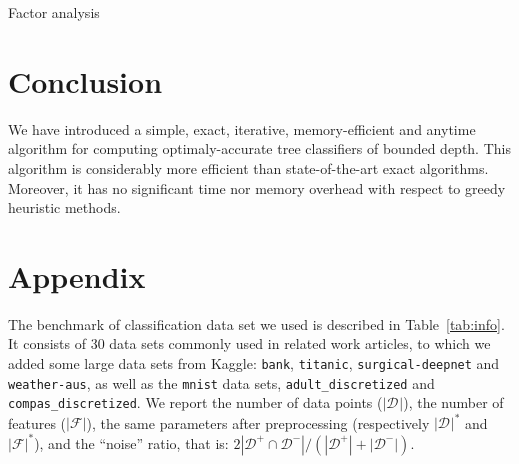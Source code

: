 \documentclass{llncs}
\def\posclass{+}
\def\negclass{-}
\def\datasymb{D}
\newcommand{\setex}[1]{\ensuremath{{\mathcal \datasymb}^{#1}}\xspace}
\newcommand{\posex}{{\setex{\posclass}}\xspace}
\newcommand{\negex}{{\setex{\negclass}}\xspace}
\newcommand{\allex}{{\setex{}}\xspace}
\newcommand{\features}{\ensuremath{{\mathcal F}}\xspace}
\begin{document}
\begin{table}[htbp]
\begin{center}
\begin{footnotesize}
\tabcolsep=2pt

\end{footnotesize}
\end{center}
\caption{\label{tab:factor} Factor analysis}
\end{table}

% 


\section{Conclusion}

We have introduced a simple, exact, iterative, memory-efficient and anytime algorithm for computing optimaly-accurate tree classifiers of bounded depth.
This algorithm is considerably more efficient than state-of-the-art exact algorithms. Moreover, it has no significant time nor memory overhead with respect to greedy heuristic methods.







\clearpage


\section*{Appendix}

The benchmark of classification data set we used is described in Table~\ref{tab:info}. It consists of 30 data sets 
commonly used in related work articles, to which we added some large data sets from Kaggle: \texttt{bank}, \texttt{titanic}, \texttt{surgical-deepnet} and \texttt{weather-aus}, as well as the \texttt{mnist} data sets, \texttt{adult\_discretized} and \texttt{compas\_discretized}. We report the number of data points ($|\allex|$), the number of features ($|\features|$), the same parameters after preprocessing (respectively $|\allex|^*$ and $|\features|^*$), and the ``noise'' ratio, that is: $2|\posex \cap \negex|/(|\posex|+|\negex|)$.
\end{document}
